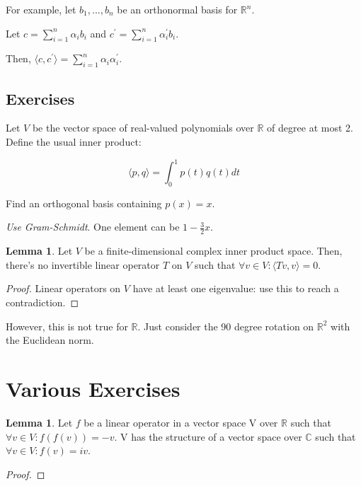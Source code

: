 \documentclass{article}
\theoremstyle{definition}
\newtheorem{lemma}[theorem]{Lemma}
\newcommand{\R}{\mathbb{R}}
\newcommand{\C}{\mathbb{C}}
\begin{document}
For example, let $b_{1},...,b_{n}$ be an orthonormal basis for $\R^{n}$.

Let $c = \sum_{i = 1}^{n} \alpha_{i}b_{i}$ and $c^{\prime} = \sum_{i = 1}^{n} \alpha^{\prime}_{i}b_{i}$.

Then, $\langle c, c^{\prime} \rangle = \sum_{i = 1}^{n} \alpha_{i}\alpha^{\prime}_{i}$.

\subsection{Exercises}

Let $V$ be the vector space of real-valued polynomials over $\R$ of degree at most 2.
Define the usual inner product:

\[ \langle p,q \rangle = \int_{0}^{1} p(t)q(t)dt\]

Find an orthogonal basis containing $p(x) = x$.

\textit{Use Gram-Schmidt}. One element can be $1 - \frac{3}{2}x$.

\newpage

\begin{lemma}
    Let $V$ be a finite-dimensional complex inner product space.
    Then, there's no invertible linear operator $T$ on $V$ such that $\forall v \in V: \langle Tv, v \rangle = 0$.
\end{lemma}
\begin{proof}
    Linear operators on $V$ have at least one eigenvalue: use this to reach a contradiction.
\end{proof}

However, this is not true for $\R$. Just consider the 90 degree rotation on $\R^{2}$
with the Euclidean norm.


\newpage

\section{Various Exercises}

\begin{lemma}
    Let $f$ be a linear operator in a vector space V over $\R$ such that $\forall v \in V: f(f(v)) = -v$. V has the structure of a vector space over $\C$ such that $\forall v \in V: f(v) = iv$.  
\end{lemma}
\begin{proof}
    
\end{proof}
\end{document}
